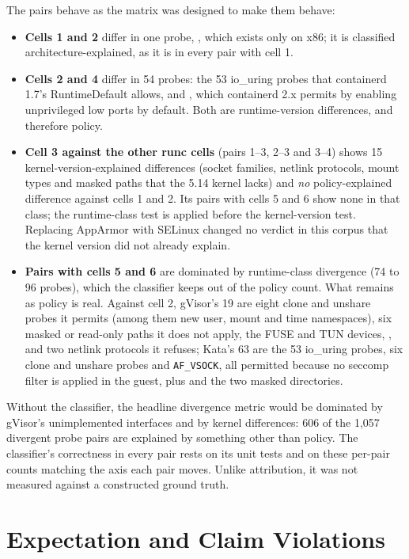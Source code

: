 The pairs behave as the matrix was designed to make them behave:
\begin{itemize}[leftmargin=*]
\item \textbf{Cells 1 and 2} differ in one probe, , which exists only on x86; it is classified architecture-explained, as it is in every pair with cell 1.
\item \textbf{Cells 2 and 4} differ in 54 probes: the 53 io\_uring probes that containerd 1.7's RuntimeDefault allows, and , which containerd 2.x permits by enabling unprivileged low ports by default. Both are runtime-version differences, and therefore policy.
\item \textbf{Cell 3 against the other runc cells} (pairs 1--3, 2--3 and 3--4) shows 15 kernel-version-explained differences (socket families, netlink protocols, mount types and masked paths that the 5.14 kernel lacks) and \emph{no} policy-explained difference against cells 1 and 2. Its pairs with cells 5 and 6 show none in that class; the runtime-class test is applied before the kernel-version test. Replacing AppArmor with SELinux changed no verdict in this corpus that the kernel version did not already explain.
\item \textbf{Pairs with cells 5 and 6} are dominated by runtime-class divergence (74 to 96 probes), which the classifier keeps out of the policy count. What remains as policy is real. Against cell 2, gVisor's 19 are eight clone and unshare probes it permits (among them new user, mount and time namespaces), six masked or read-only paths it does not apply, the FUSE and TUN devices, , and two netlink protocols it refuses; Kata's 63 are the 53 io\_uring probes, six clone and unshare probes and \texttt{AF\_VSOCK}, all permitted because no seccomp filter is applied in the guest, plus  and the two masked directories.
\end{itemize}

Without the classifier, the headline divergence metric would be dominated by gVisor's unimplemented interfaces and by kernel differences: 606 of the 1,057 divergent probe pairs are explained by something other than policy. The classifier's correctness in every pair rests on its unit tests and on these per-pair counts matching the axis each pair moves. Unlike attribution, it was not measured against a constructed ground truth.

\section{Expectation and Claim Violations}
\label{sec:res-findings}

